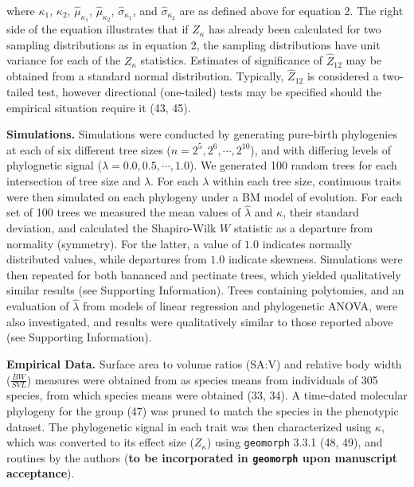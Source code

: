 \documentclass[9pt,twocolumn,twoside,lineno]{pnas-new}
\begin{document}
where \(\kappa_1\), \(\kappa_2\), \(\hat\mu_{\kappa_1}\),
\(\hat\mu_{\kappa_2}\), \(\hat\sigma_{\kappa_1}\), and
\(\hat\sigma_{\kappa_2}\) are as defined above for equation 2. The right
side of the equation illustrates that if \(Z_\kappa\) has already been
calculated for two sampling distributions as in equation 2, the sampling
distributions have unit variance for each of the \(Z_\kappa\)
statistics. Estimates of significance of \(\hat{Z}_{12}\) may be
obtained from a standard normal distribution. Typically,
\(\hat{Z}_{12}\) is considered a two-tailed test, however directional
(one-tailed) tests may be specified should the empirical situation
require it (43, 45).

\textbf{Simulations.} Simulations were conducted by generating
pure-birth phylogenies at each of six different tree sizes
(\(n=2^5, 2^6, \cdots, 2^{10}\)), and with differing levels of
phylognetic signal (\(\lambda=0.0, 0.5, \cdots, 1.0\)). We generated 100
random trees for each intersection of tree size and \(\lambda\). For
each \(\lambda\) within each tree size, continuous traits were then
simulated on each phylogeny under a BM model of evolution. For each set
of 100 trees we measured the mean values of \(\hat{\lambda}\) and
\(\kappa\), their standard deviation, and calculated the Shapiro-Wilk
\(W\) statistic as a departure from normality (symmetry). For the
latter, a value of \(1.0\) indicates normally distributed values, while
departures from \(1.0\) indicate skewness. Simulations were then
repeated for both bananced and pectinate trees, which yielded
qualitatively similar results (see Supporting Information). Trees
containing polytomies, and an evaluation of \(\hat{\lambda}\) from
models of linear regression and phylogenetic ANOVA, were also
investigated, and results were qualitatively similar to those reported
above (see Supporting Information).

\textbf{Empirical Data.} Surface area to volume ratios (SA:V) and
relative body width (\(\frac{BW}{SVL}\)) measures were obtained from as
species means from individuals of 305 species, from which species means
were obtained (33, 34). A time-dated molecular phylogeny for the group
(47) was pruned to match the species in the phenotypic dataset. The
phylogenetic signal in each trait was then characterized using
\(\kappa\), which was converted to its effect size (\(Z_\kappa\)) using
\texttt{geomorph} 3.3.1 (48, 49), and routines by the authors
(\textbf{to be incorporated in \texttt{geomorph} upon manuscript
acceptance}).

\showmatmethods
\showacknow
\pnasbreak
\end{document}
